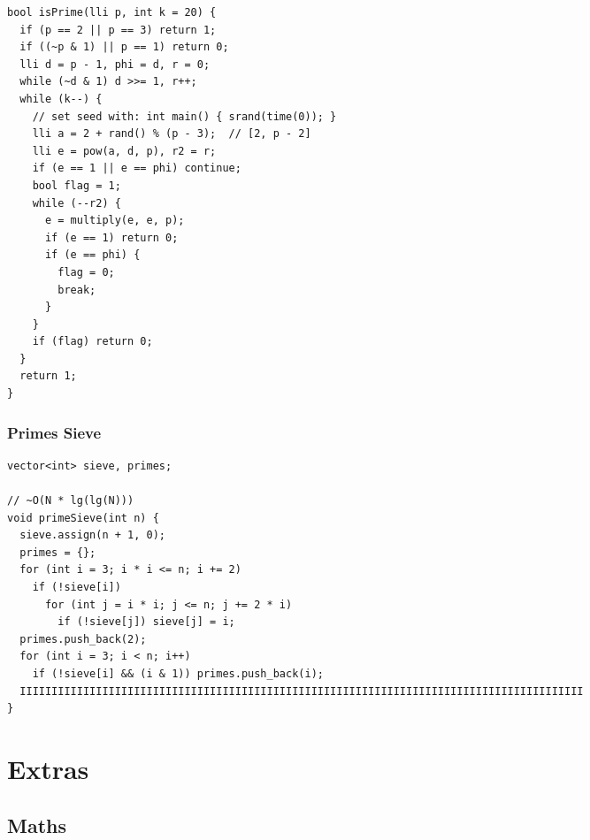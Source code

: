 \documentclass[twoside]{article}
\begin{document}
\begin{multicols*}{2}
\begin{verbatim}
bool isPrime(lli p, int k = 20) {
  if (p == 2 || p == 3) return 1;
  if ((~p & 1) || p == 1) return 0;
  lli d = p - 1, phi = d, r = 0;
  while (~d & 1) d >>= 1, r++;
  while (k--) {
    // set seed with: int main() { srand(time(0)); }
    lli a = 2 + rand() % (p - 3);  // [2, p - 2]
    lli e = pow(a, d, p), r2 = r;
    if (e == 1 || e == phi) continue;
    bool flag = 1;
    while (--r2) {
      e = multiply(e, e, p);
      if (e == 1) return 0;
      if (e == phi) {
        flag = 0;
        break;
      }
    }
    if (flag) return 0;
  }
  return 1;
}
\end{verbatim}

\subsubsectionfont{\large\bfseries\sffamily\underline}
\subsubsection*{Primes Sieve}
\begin{verbatim}
vector<int> sieve, primes;

// ~O(N * lg(lg(N)))
void primeSieve(int n) {
  sieve.assign(n + 1, 0);
  primes = {};
  for (int i = 3; i * i <= n; i += 2)
    if (!sieve[i])
      for (int j = i * i; j <= n; j += 2 * i)
        if (!sieve[j]) sieve[j] = i;
  primes.push_back(2);
  for (int i = 3; i < n; i++)
    if (!sieve[i] && (i & 1)) primes.push_back(i);
  IIIIIIIIIIIIIIIIIIIIIIIIIIIIIIIIIIIIIIIIIIIIIIIIIIIIIIIIIIIIIIIIIIIIIIIIIIIIIIIIIIIIIIIII
}
\end{verbatim}

\end{multicols*}
\sectionfont{\bfseries\sffamily\centering\Huge}
\vspace{1em}
\section*{Extras}
\vspace{3em}
\subsectionfont{\bfseries\sffamily\centering\LARGE}
\vspace{0em}
\subsection*{Maths}
\vspace{2em}
\subsubsectionfont{\large\bfseries\sffamily\underline}
\end{document}

